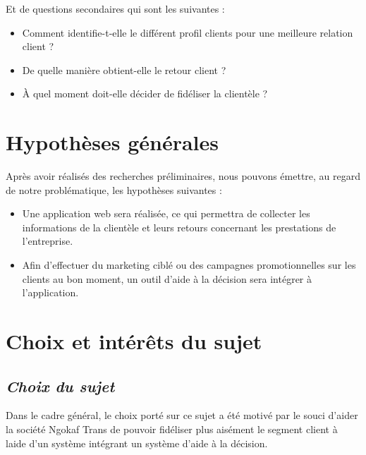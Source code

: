     Et de questions secondaires qui sont les suivantes :
    \par
        \begin{itemize}
            \setlength{\itemsep}{0pt}
            \item [\ding{226}] Comment identifie-t-elle le différent profil clients pour une
            meilleure relation client ?
            \item [\ding{226}] De quelle manière obtient-elle le retour client ?
            \item [\ding{226}] À quel moment doit-elle décider de fidéliser la clientèle ?
        \end{itemize}
    \section[Hypothèses générales]{Hypothèses générales}
    Après avoir réalisés des recherches préliminaires, nous pouvons émettre, au regard
    de notre problématique, les hypothèses suivantes :
    \par
        \begin{itemize}
            \setlength{\itemsep}{0pt}
            \item [\ding{226}] Une application web sera réalisée, ce qui permettra de collecter
            les informations de la clientèle et leurs retours concernant les prestations de l’entreprise.
            \item [\ding{226}] Afin d’effectuer du marketing ciblé ou des campagnes
            promotionnelles sur les clients au bon moment,
            un outil d’aide à la décision sera intégrer à l’application.
        \end{itemize}
    \section[Choix et interet du sujet]{Choix et intérêts du sujet}
        \subsection[Choix du sujet]{\textit{Choix du sujet}}
        Dans le cadre général, le choix porté sur ce sujet a été motivé par le souci d’aider
        la société Ngokaf Trans de pouvoir fidéliser plus aisément le segment client à laide d’un
        système intégrant un système d’aide à la décision.
